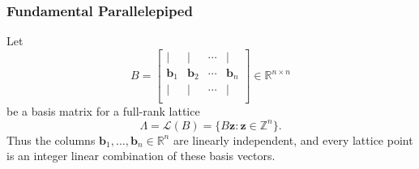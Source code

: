 %
%
%
%
%
%
%
%
%
%

\subsubsection{Fundamental Parallelepiped}

Let
\[
B=
\begin{bmatrix}
	| & | & \cdots & | \\
	\mathbf b_1 & \mathbf b_2 & \cdots & \mathbf b_n \\
	| & | & \cdots & | \\
\end{bmatrix}
\in \mathbb R^{n\times n}
\]
be a basis matrix for a full-rank lattice
\[
\Lambda=\mathcal L(B)=\{B\mathbf z:\mathbf z\in\mathbb Z^n\}.
\]
Thus the columns \(\mathbf b_1,\dots,\mathbf b_n\in\mathbb R^n\) are linearly independent, and every lattice point is an integer linear combination of these basis vectors.

